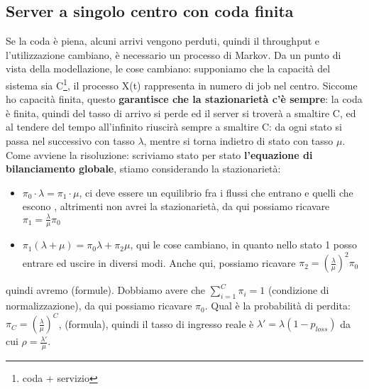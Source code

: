 \documentclass{article}
\begin{document}
\subsection{Server a singolo centro con coda finita}
Se la coda è piena, alcuni arrivi vengono perduti, quindi il throughput e l'utilizzazione cambiano, è necessario un processo di Markov. Da un punto di vista della modellazione, le cose cambiano: supponiamo che la capacità del sistema sia C\footnote{coda + servizio}, il processo X(t) rappresenta in numero di job nel centro. Siccome ho capacità finita, questo \textbf{garantisce che la stazionarietà c'è sempre}: la coda è finita, quindi del tasso di arrivo si perde ed il server si troverà a smaltire C, ed al tendere del tempo all'infinito riuscirà sempre a smaltire C: da ogni stato si passa nel successivo con tasso $\lambda$, mentre si torna indietro di stato con tasso $\mu$.\\ Come avviene la risoluzione: scriviamo stato per stato \textbf{l'equazione di bilanciamento globale}, stiamo considerando la stazionarietà:
\begin{itemize}
\item $\pi_0 \cdot \lambda = \pi_1 \cdot \mu$, ci deve essere un equilibrio fra i flussi che entrano e quelli che escono , altrimenti non avrei la stazionarietà, da qui possiamo ricavare $\pi_1 = \frac{\lambda}{\mu}\pi_0$
\item $\pi_1(\lambda + \mu) = \pi_0 \lambda + \pi_2 \mu$, qui le cose cambiano, in quanto nello stato 1 posso entrare ed uscire in diversi modi. Anche qui, possiamo ricavare $\pi_2 = (\frac{\lambda}{\mu})^2 \pi_0$
\end{itemize}
quindi avremo (formule). Dobbiamo avere che $\sum\limits_{i=1}^{C} \pi_i = 1$ (condizione di normalizzazione), da qui possiamo ricavare $\pi_0$. Qual è la probabilità di perdita: $\pi_C = (\frac{\lambda}{\mu})^C$, (formula), quindi il tasso di ingresso reale è $\lambda' = \lambda(1 - p_{loss})$ da cui $\rho = \frac{\lambda'}{\mu}$. 
\end{document}
